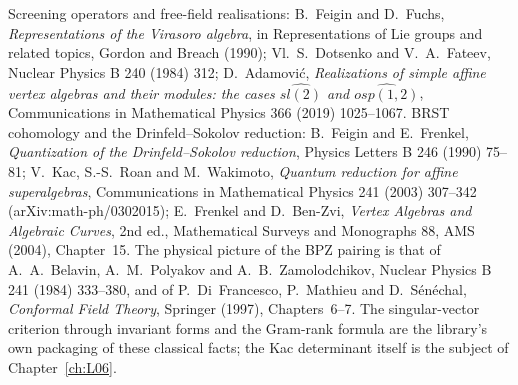Screening operators and free-field realisations: B.~Feigin and D.~Fuchs, \emph{Representations of the
Virasoro algebra}, in Representations of Lie groups and related topics, Gordon and Breach (1990);
Vl.~S.~Dotsenko and V.~A.~Fateev, Nuclear Physics B 240 (1984) 312; D.~Adamovi\'c, \emph{Realizations of
simple affine vertex algebras and their modules: the cases $\widehat{sl(2)}$ and $\widehat{osp(1,2)}$},
Communications in Mathematical Physics 366 (2019) 1025--1067. BRST cohomology and the
Drinfeld--Sokolov reduction: B.~Feigin and E.~Frenkel, \emph{Quantization of the Drinfeld--Sokolov
reduction}, Physics Letters B 246 (1990) 75--81; V.~Kac, S.-S.~Roan and M.~Wakimoto, \emph{Quantum reduction
for affine superalgebras}, Communications in Mathematical Physics 241 (2003) 307--342
(arXiv:math-ph/0302015); E.~Frenkel and D.~Ben-Zvi, \emph{Vertex Algebras and Algebraic Curves}, 2nd ed.,
Mathematical Surveys and Monographs 88, AMS (2004), Chapter~15. The physical picture of the BPZ pairing
is that of A.~A.~Belavin, A.~M.~Polyakov and A.~B.~Zamolodchikov, Nuclear Physics B 241 (1984) 333--380,
and of P.~Di~Francesco, P.~Mathieu and D.~S\'en\'echal, \emph{Conformal Field Theory}, Springer (1997),
Chapters~6--7. The singular-vector criterion through invariant forms and the Gram-rank formula are the
library's own packaging of these classical facts; the Kac determinant itself is the subject of
Chapter~\ref{ch:L06}.

\endgroup
